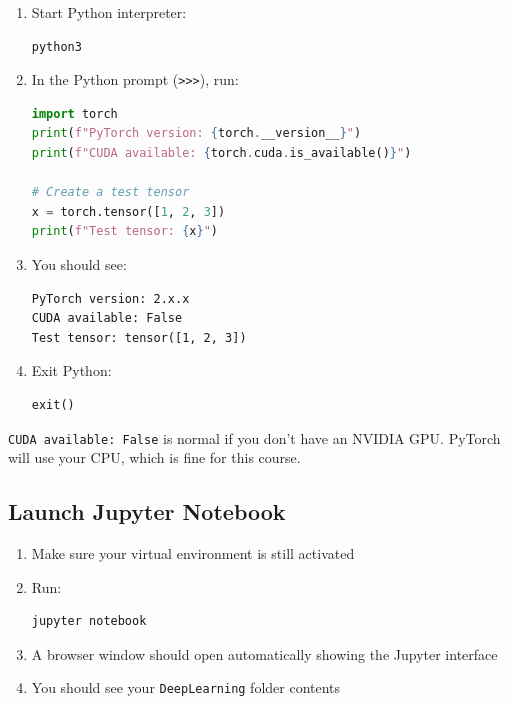 \documentclass[11pt,a4paper]{article}
\begin{document}
\begin{enumerate}
    \item Start Python interpreter:
    \begin{lstlisting}[language=bash]
python3
    \end{lstlisting}
    
    \item In the Python prompt (\texttt{>>>}), run:
    \begin{lstlisting}[language=Python]
import torch
print(f"PyTorch version: {torch.__version__}")
print(f"CUDA available: {torch.cuda.is_available()}")

# Create a test tensor
x = torch.tensor([1, 2, 3])
print(f"Test tensor: {x}")
    \end{lstlisting}
    
    \item You should see:
    \begin{lstlisting}
PyTorch version: 2.x.x
CUDA available: False
Test tensor: tensor([1, 2, 3])
    \end{lstlisting}
    
    \item Exit Python:
    \begin{lstlisting}[language=Python]
exit()
    \end{lstlisting}
\end{enumerate}

\begin{infobox}
\texttt{CUDA available: False} is normal if you don't have an NVIDIA GPU. PyTorch will use your CPU, which is fine for this course.
\end{infobox}

\subsection{Launch Jupyter Notebook}

\begin{enumerate}
    \item Make sure your virtual environment is still activated
    
    \item Run:
    \begin{lstlisting}[language=bash]
jupyter notebook
    \end{lstlisting}
    
    \item A browser window should open automatically showing the Jupyter interface
    
    \item You should see your \texttt{DeepLearning} folder contents
\end{enumerate}
\end{document}
